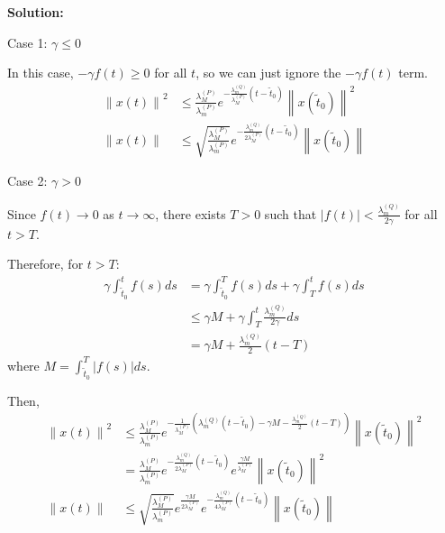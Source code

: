\documentclass[12pt]{article}
\newcommand{\norm}[1]{\left\lVert #1 \right\rVert}
\newenvironment{solution}{
    \textbf{Solution:}
    
}{
    
    \vspace{2em}
}
\begin{document}
\begin{solution}
    Case 1: \(\gamma \leq 0\)
    
    In this case, \(-\gamma f(t) \geq 0\) for all \(t\), so we can just ignore the \(-\gamma f(t)\) term.
    \[
        \begin{aligned}
            \norm{x(t)}^2 &\leq \frac{\lambda^{(P)}_M}{\lambda^{(P)}_m} e^{-\frac{\lambda^{(Q)}_m}{\lambda^{(P)}_M}(t-\tilde{t}_0)} \norm{x(\tilde{t}_0)}^2\\
            \norm{x(t)} &\leq \sqrt{\frac{\lambda^{(P)}_M}{\lambda^{(P)}_m}} e^{-\frac{\lambda^{(Q)}_m}{2\lambda^{(P)}_M}(t-\tilde{t}_0)} \norm{x(\tilde{t}_0)}
        \end{aligned}
    \]
    
    Case 2: \(\gamma > 0\)
    
    Since \(f(t) \to 0\) as \(t \to \infty\), there exists \(T > 0\) such that \(|f(t)| < \frac{\lambda^{(Q)}_m}{2\gamma}\) for all \(t > T\).
    
    Therefore, for \(t > T\):
    \[
        \begin{aligned}
            \gamma\int_{\tilde{t}_0}^t f(s)ds &= \gamma\int_{\tilde{t}_0}^T f(s)ds + \gamma\int_T^t f(s)ds \\
            &\leq \gamma M + \gamma\int_T^t \frac{\lambda^{(Q)}_m}{2\gamma}ds \\
            &= \gamma M + \frac{\lambda^{(Q)}_m}{2}(t-T)
        \end{aligned}
    \]
    where \(M = \int_{\tilde{t}_0}^T |f(s)|ds\).
    
    Then,
    \[
        \begin{aligned}
            \norm{x(t)}^2 &\leq \frac{\lambda^{(P)}_M}{\lambda^{(P)}_m} e^{-\frac{1}{\lambda^{(P)}_M}\left(\lambda^{(Q)}_m(t-\tilde{t}_0) - \gamma M - \frac{\lambda^{(Q)}_m}{2}(t-T)\right)} \norm{x(\tilde{t}_0)}^2 \\
            &= \frac{\lambda^{(P)}_M}{\lambda^{(P)}_m} e^{-\frac{\lambda^{(Q)}_m}{2\lambda^{(P)}_M}(t-\tilde{t}_0)} e^{\frac{\gamma M}{\lambda^{(P)}_M}} \norm{x(\tilde{t}_0)}^2 \\
            \norm{x(t)} &\leq \sqrt{\frac{\lambda^{(P)}_M}{\lambda^{(P)}_m}} e^{\frac{\gamma M}{2\lambda^{(P)}_M}} e^{-\frac{\lambda^{(Q)}_m}{4\lambda^{(P)}_M}(t-\tilde{t}_0)} \norm{x(\tilde{t}_0)}
        \end{aligned}
    \]
\end{solution}
\end{document}
